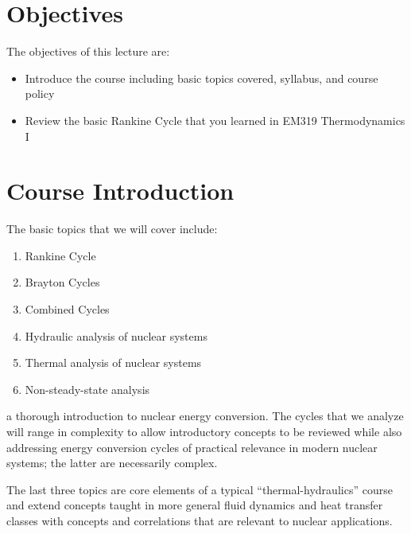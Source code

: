 \documentclass{tufte-book}
\begin{document}
\section{Objectives}
The objectives of this lecture are:
\begin{itemize}
\item Introduce the course including basic topics covered, syllabus, and course policy
\item Review the basic Rankine Cycle that you learned in EM319 Thermodynamics I
\end{itemize}

\section{Course Introduction}
The basic topics that we will cover include:
\begin{enumerate}
\item Rankine Cycle 
\item Brayton Cycles
\item Combined Cycles 
\item Hydraulic analysis of nuclear systems
\item Thermal analysis of nuclear systems
\item Non-steady-state analysis 
\end{enumerate}
 a thorough introduction to nuclear energy conversion.  The cycles that we analyze will range in complexity to allow introductory concepts to be reviewed while also addressing energy conversion cycles of practical relevance in modern nuclear systems; the latter are necessarily complex.

The last three topics are core elements of a typical ``thermal-hydraulics'' course and extend concepts taught in more general fluid dynamics and heat transfer classes with concepts and correlations that are relevant to nuclear applications.
\end{document}
